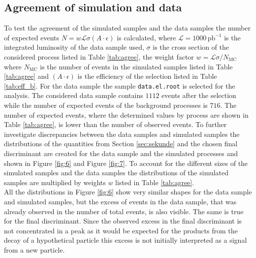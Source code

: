 \subsection{Agreement of simulation and data}
To test the agreement of the simulated samples and the data samples the number of expected events $N = w \mathcal{L} \sigma (A \cdot \epsilon)$ is calculated,
where $\mathcal{L} = 1000 \, \si{\pico\barn\tothe{-1}}$ is the integrated luminosity of the data sample used, $\sigma$ is the cross section of the considered
process listed in Table \ref{tab:agree}, the weight factor $w = \mathcal{L} \sigma / N_\text{MC}$ where $N_\text{MC}$ is the number of events in the
simulated samples listed in Table \ref{tab:agree} and $(A \cdot \epsilon)$ is the efficiency of the selection listed in Table \ref{tab:eff_b}.
For the data sample the sample \texttt{data.el.root} is selected for the analysis.
The considered data sample contains $1112$ events after the selection while the number of expected events of the background processes is $716$.
The number of expected events, where the determined values by process are shown in Table \ref{tab:agree}, is lower than the number of observed events.
To further investigate discrepancies between the data samples and simulated samples the distributions of the quantities from Section \ref{sec:sekunde} and the
chosen final discriminant are created for the data sample and the simulated processes and shown in Figure \ref{fig:6} and Figure \ref{fig:7}.
To account for the different sizes of the simulated samples and the data samples the distributions of the simulated samples are multiplied by weights $w$
listed in Table \ref{tab:agree}.\\
All the distributions in Figure \ref{fig:6} show very similar shapes for the data sample and simulated samples, but the excess of events in the
data sample, that was already observed in the number of total events, is also visible. The same is true for the final discriminant.
Since the observed excess in the final discriminant is not concentrated in a peak as it would be expected for the products from the
decay of a hypothetical particle this excess is not initially interpreted as a signal from a new particle.


